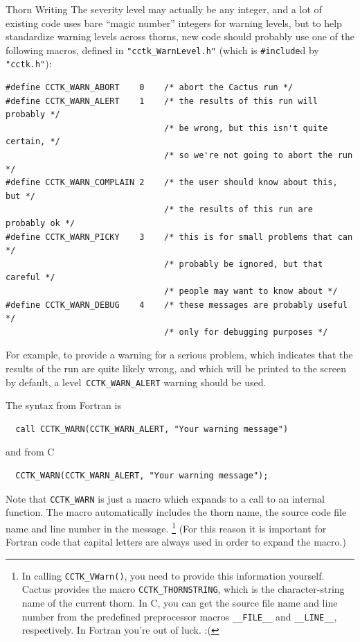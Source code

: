 \begin{cactuspart}{Thorn Writing}
The severity level may actually be any integer, and a lot of existing
code uses bare ``magic number'' integers for warning levels, but to
help standardize warning levels across thorns, new code should probably
use one of the following macros, defined in \verb|"cctk_WarnLevel.h"|
(which is \verb|#include|d by \verb|"cctk.h"|):
\begin{verbatim}
#define CCTK_WARN_ABORT    0    /* abort the Cactus run */
#define CCTK_WARN_ALERT    1    /* the results of this run will probably */
                                /* be wrong, but this isn't quite certain, */
                                /* so we're not going to abort the run */
#define CCTK_WARN_COMPLAIN 2    /* the user should know about this, but */
                                /* the results of this run are probably ok */
#define CCTK_WARN_PICKY    3    /* this is for small problems that can */
                                /* probably be ignored, but that careful */
                                /* people may want to know about */
#define CCTK_WARN_DEBUG    4    /* these messages are probably useful */
                                /* only for debugging purposes */
\end{verbatim}

For example, to provide a warning for a serious problem, which
indicates that the results of the run are quite likely wrong,
and which will be printed to the screen by default,
a level~\verb|CCTK_WARN_ALERT| warning should be used.

The syntax from Fortran is
\begin{verbatim}
  call CCTK_WARN(CCTK_WARN_ALERT, "Your warning message")
\end{verbatim}

and from C
\begin{verbatim}
  CCTK_WARN(CCTK_WARN_ALERT, "Your warning message");
\end{verbatim}

Note that \texttt{CCTK\_WARN} is just a macro which expands to a call
to an internal function.  The macro automatically includes the thorn name, the source code file name and line number in the message.%
\footnote{%
         In calling \texttt{CCTK\_VWarn()}, you need to
         provide this information yourself.  Cactus
         provides the macro \texttt{CCTK\_THORNSTRING},
         which is the character-string name of the
         current thorn.  In C, you can get the source
         file name and line number from the predefined
         preprocessor macros \texttt{\_\_FILE\_\_} and
         \texttt{\_\_LINE\_\_}, respectively.  In Fortran
         you're out of luck. :(
         }%
{}  (For this reason it is important for Fortran code that capital
letters are always used in order to expand the macro.)


\end{cactuspart}
